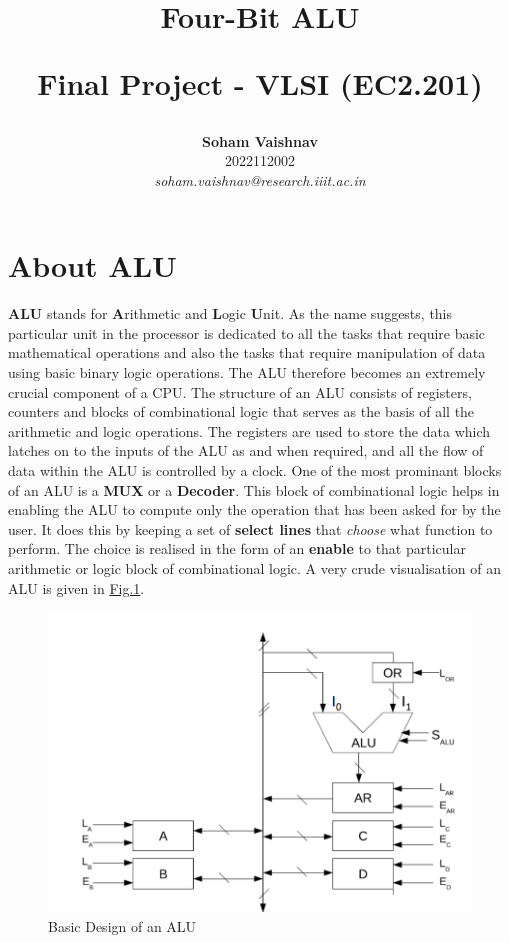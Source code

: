 \documentclass[a4paper, titlepage]{article}
\title{
    \begin{center}
        \Huge \textbf{Four-Bit ALU}
    \end{center}
    \vspace{0.5cm}
    \textbf{Final Project} - VLSI (EC2.201)\\
}
\author{
    \textbf{Soham Vaishnav}\\ 
    2022112002\\
    \textit{soham.vaishnav@research.iiit.ac.in}
}
\begin{document}
\maketitle
\tableofcontents

\newpage

\section{About ALU}
\textbf{ALU} stands for \textbf{A}rithmetic and \textbf{L}ogic \textbf{U}nit.
As the name suggests, this particular unit in the processor is dedicated to all the tasks
that require basic mathematical operations and also the tasks that require manipulation of data 
using basic binary logic operations. The ALU therefore becomes an extremely crucial component of 
a CPU. \newline 
The structure of an ALU consists of registers, counters and blocks of combinational logic 
that serves as the basis of all the arithmetic and logic operations. The registers are used to 
store the data which latches on to the inputs of the ALU as and when required, and all the flow
of data within the ALU is controlled by a clock. \newline 
One of the most prominant blocks of an ALU is a \textbf{MUX} or a \textbf{Decoder}. This block of 
combinational logic helps in enabling the ALU to compute only the operation that has been asked for
by the user. It does this by keeping a set of \textbf{select lines} that \textit{choose} what function 
to perform. The choice is realised in the form of an \textbf{enable} to that particular arithmetic or 
logic block of combinational logic. A very crude visualisation of an ALU is given in \hyperlink{ALU}{Fig.1}.

\begin{figure}[htp]
\centering
\hypertarget{ALU}{\includegraphics[width=\textwidth]{Image_ALU.png}}
\caption{Basic Design of an ALU}
\label{fig:sysfig}
\end{figure}
\end{document}
